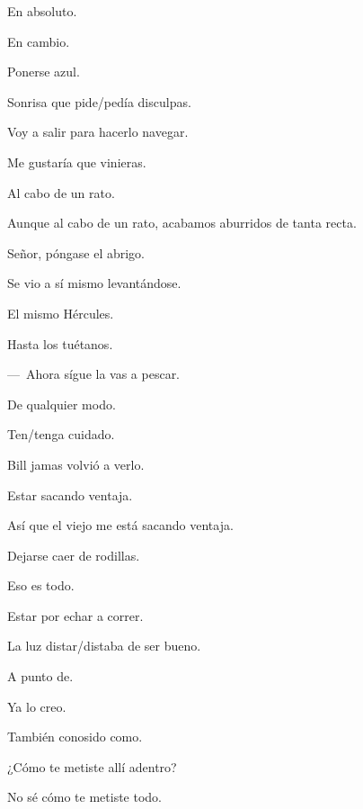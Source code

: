 \sk
En absoluto. 

\sk
En cambio. 

\sk
Ponerse azul. 

\sk
Sonrisa que pide/pedía disculpas. 

\sk
Voy a salir para hacerlo navegar. \nb{}

\sk
Me gustaría que vinieras. 

\sk
Al cabo de un rato. 

\sk
Aunque al cabo de un rato, acabamos aburridos de tanta recta. 

\sk
Señor, póngase el abrigo. \nb{}

\sk
Se vio a sí mismo levantándose. 

\sk
El mismo Hércules. 

\sk
Hasta los tuétanos. 

\sk
---~Ahora sígue la vas a pescar. 

\sk
De qualquier modo. 

\sk
Ten/tenga cuidado. 

\sk
Bill jamas volvió a verlo. 

\sk
Estar sacando ventaja. 

\sk
Así que el viejo me está sacando ventaja. 

\sk
Dejarse caer de rodillas. 

\sk
Eso es todo. 

\sk
Estar por echar a correr. 

\sk
La luz distar/distaba de ser bueno. 

\sk
A punto de. 

\sk
Ya lo creo. 

\sk
También conosido como. 

\sk
¿Cómo te metiste allí adentro? 

\sk
No sé cómo te metiste todo. 

